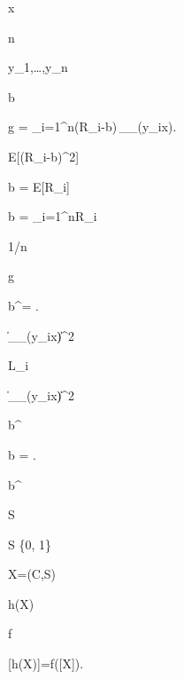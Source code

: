 x


n


y_1,\ldots,y_n


b


\widehat g = \sum_{i=1}^{n}(R_i-b)\,\nabla_\theta\log\pi_\theta(y_i\mid x).


\mathbb E[(R_i-b)^2]


b = \mathbb E[R_i]


b = \sum_{i=1}^{n}R_i


1/n


\hat g


b^\star = .


\left\|\nabla_\theta\log\pi_\theta(y_i\mid x)\right\|^2


L_i


\left\|\nabla_\theta\log\pi_\theta(y_i\mid x)\right\|^2


b^\star


\widehat b = .


b^\star


S \in [0, 1]


S \in \{0, 1\}


X=(C,S)


h(X)


f


[h(X)]=f([X]).

